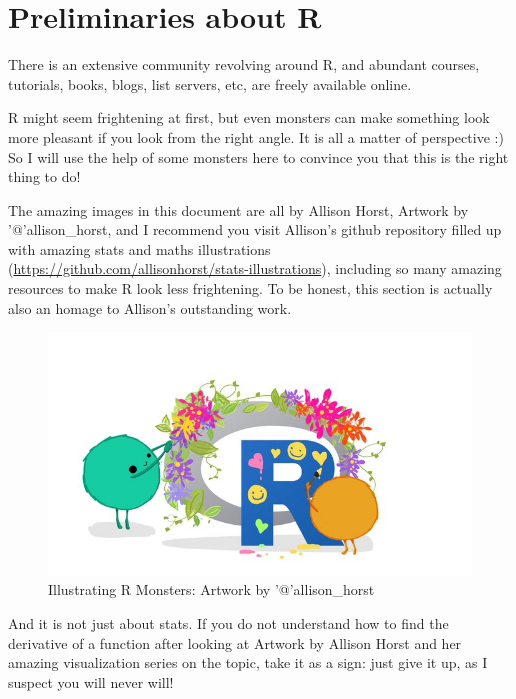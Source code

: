 \documentclass[
]{article}
\begin{document}
\hypertarget{preliminaries-about-r}{%
\section{Preliminaries about R}\label{preliminaries-about-r}}

There is an extensive community revolving around R, and abundant
courses, tutorials, books, blogs, list servers, etc, are freely
available online.

R might seem frightening at first, but even monsters can make something
look more pleasant if you look from the right angle. It is all a matter
of perspective :) So I will use the help of some monsters here to
convince you that this is the right thing to do!

The amazing images in this document are all by Allison Horst, Artwork by
'@'allison\_horst, and I recommend you visit Allison's github repository
filled up with amazing stats and maths illustrations
(\url{https://github.com/allisonhorst/stats-illustrations}), including
so many amazing resources to make R look less frightening. To be honest,
this section is actually also an homage to Allison's outstanding work.

\begin{figure}
\centering
\includegraphics{extfiles/monsteRs.jpg}
\caption{Illustrating R Monsters: Artwork by '@'allison\_horst}
\end{figure}

And it is not just about stats. If you do not understand how to find the
derivative of a function after looking at Artwork by Allison Horst and
her amazing visualization series on the topic, take it as a sign: just
give it up, as I suspect you will never will!
\end{document}
